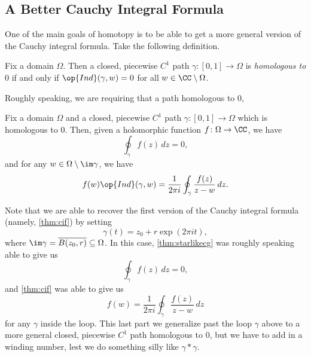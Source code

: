 \documentclass[../notes.tex]{subfiles}
\begin{document}
\subsection{A Better Cauchy Integral Formula}
One of the main goals of homotopy is to be able to get a more general version of the Cauchy integral formula. Take the following definition.
\begin{definition}
	Fix a domain $\Omega$. Then a closed, piecewise $C^1$ path $\gamma\colon [0,1]\to\Omega$ is \textit{homologous to $0$} if and only if $\op{Ind}(\gamma,w)=0$ for all $w\in\CC\setminus\Omega$.
\end{definition}
Roughly speaking, we are requiring that a path homologous to $0$, 
\begin{theorem} \label{thm:cif2}
	Fix a domain $\Omega$ and a closed, piecewise $C^1$ path $\gamma\colon [0,1]\to\Omega$ which is homologous to $0$. Then, given a holomorphic function $f\colon \Omega\to\CC$, we have
	\[\oint_\gamma f(z)\,dz=0,\]
	and for any $w\in\Omega\setminus\im\gamma$, we have
	\[f(w)\op{Ind}(\gamma,w)=\frac1{2\pi i}\oint_\gamma\frac{f(z)}{z-w}\,dz.\]
\end{theorem}
Note that we are able to recover the first version of the Cauchy integral formula (namely, \autoref{thm:cif}) by setting
\[\gamma(t)=z_0+r\exp(2\pi it),\]
where $\im\gamma=\overline{B(z_0,r)}\subseteq\Omega$. In this case, \autoref{thm:starlikecg} was roughly speaking able to give us
\[\oint_\gamma f(z)\,dz=0,\]
and \autoref{thm:cif} was able to give us
\[f(w)=\frac1{2\pi i}\oint_\gamma\frac{f(z)}{z-w}\,dz\]
for any $\gamma$ inside the loop. This last part we generalize past the loop $\gamma$ above to a more general closed, piecewise $C^1$ path homologous to $0$, but we have to add in a winding number, lest we do something silly like $\gamma*\gamma$.
\end{document}
